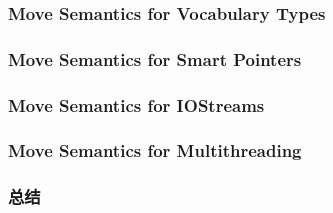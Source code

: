 \documentclass[11pt,a4paper,UTF8]{ctexart}
\begin{document}
		\subsubsection{Move Semantics for Vocabulary Types}
		\subsubsection{Move Semantics for Smart Pointers}
		\subsubsection{Move Semantics for IOStreams}
		\subsubsection{Move Semantics for Multithreading}
		\subsubsection{总结}
\end{document}
